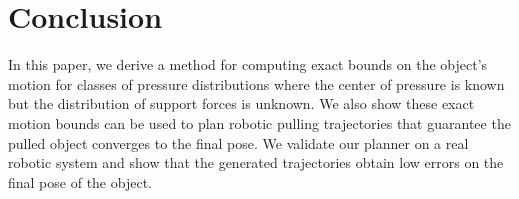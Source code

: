 \documentclass[conference]{IEEEtran}
\begin{document}
\section{Conclusion}\label{sec:conclusion}

In this paper, we derive a method for computing exact bounds on the
object's motion for classes of pressure distributions where the center
of pressure is known but the distribution of support forces is
unknown. We also show these exact motion bounds can be used to plan
robotic pulling trajectories that guarantee the pulled object
converges to the final pose. We validate our planner on a real robotic
system and show that the generated trajectories obtain low errors on
the final pose of the object.



\end{document}
